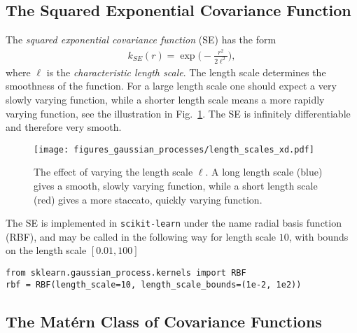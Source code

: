 \documentclass[twoside,english]{uiofysmaster}
\begin{document}
\subsection{The Squared Exponential Covariance Function}

The \textit{squared exponential covariance function} (SE) has the form 
\begin{align}
k_{SE} (r) = \exp \Big( - \frac{r^2}{2 \ell^2} \Big),
\end{align} 
where $\ell$ is the \textit{characteristic length scale}. The length scale determines the smoothness of the function. For a large length scale one should expect a very slowly varying function, while a shorter length scale means a more rapidly varying function, see the illustration in Fig.~\ref{Fig:: gaussian process : ell variation example}. The SE is infinitely differentiable and therefore very smooth. 

\begin{figure}
\centering
\texttt{[image: figures\_gaussian\_processes/length\_scales\_xd.pdf]}
\caption{The effect of varying the length scale $\ell$. A long length scale (blue) gives a smooth, slowly varying function, while a short length scale (red) gives a more staccato, quickly varying function.}
\label{Fig:: gaussian process : ell variation example}
\end{figure}

The SE is implemented in \verb|scikit-learn| under the name radial basis function (RBF), and may be called in the following way for length scale $10$, with bounds on the length scale $[0.01, 100]$
\begin{lstlisting}
from sklearn.gaussian_process.kernels import RBF
rbf = RBF(length_scale=10, length_scale_bounds=(1e-2, 1e2))
\end{lstlisting}



\subsection{The Mat\'{e}rn Class of Covariance Functions}\label{Sec:: gaussian process : Matern Class of Covariance Functions}
\end{document}
